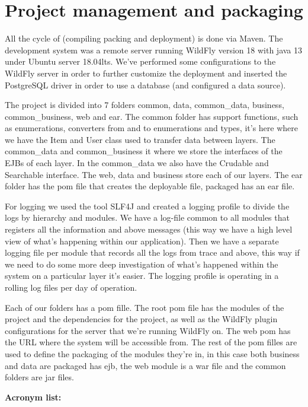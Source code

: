 \documentclass{article}
\begin{document}
\section{Project management and packaging}

\qquad All the cycle of (compiling packing and deployment) is done via Maven. The development system was a remote server running WildFly version 18 with java 13 under Ubuntu server 18.04lts. We've performed some configurations to the WildFly server in order to further customize the deployment and inserted the PostgreSQL driver in order to use a database (and configured a data source).

\qquad The project is divided into 7 folders common, data, common\_data, business, common\_business, web and ear. The common folder has support functions, such as enumerations, converters from and to enumerations and types, it's here where we have the Item and User class used to transfer data between layers. The common\_data and common\_business it where we store the interfaces of the \ac{EJB}s of each layer. In the common\_data we also have the Crudable and Searchable interface. The web, data and business store each of our layers. The ear folder has the pom file that creates the deployable file, packaged has an ear file.

\qquad For logging we used the tool \ac{SLF4J} and created a logging profile to divide the logs by hierarchy and modules. We have a log-file common to all modules that registers all the information and above messages (this way we have a high level view of what's happening within our application). Then we have a separate logging file per module that records all the logs from trace and above, this way if we need to do some more deep investigation of what's happened within the system on a particular layer it's easier. The logging profile is operating in a rolling log files per day of operation.

\qquad Each of our folders has a pom fille. The root pom file has the modules of the project and the dependencies for the project, as well as the WildFly plugin configurations for the server that we're running WildFly on. The web pom has the URL where the system will be accessible from. The rest of the pom filles are used to define the packaging of the modules they're in, in this case both business and data are packaged has ejb, the web module is a war file and the common folders are jar files.\newline\newline






\textbf{Acronym list:}

\begin{acronym}
\end{acronym}
\end{document}
